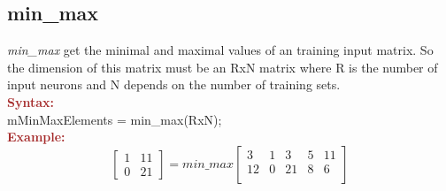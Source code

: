\subsection{min\_max}
\textit{min\_max} get the minimal and maximal values of an training input matrix. So the dimension of this matrix must be an RxN matrix where R is the number of input neurons and N depends on the number of training sets.\\

\noindent \textbf{\textcolor{brown}{Syntax:}}\\

\noindent mMinMaxElements = min\_max(RxN);\\

\noindent \textbf{\textcolor{brown}{Example:}}\\

\begin{equation}
	\left[
		\begin{array}{cc}
     	1 &  11 \\
    	0  & 21
   \end{array} 
	 \right]            = min\_max\left[ 
	 															   \begin{array}{ccccc}
	 															   3 & 1 & 3 & 5 & 11 \\
	 															   12& 0 & 21& 8 & 6  \\
	 															   \end{array}
	 															   	 \right]
\end{equation}


